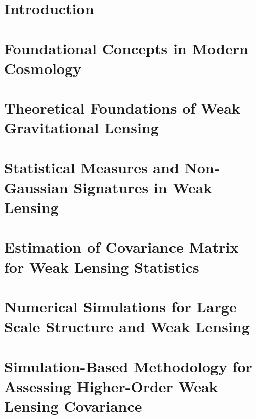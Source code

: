 \documentclass[11pt,a4paper]{ipmu}
\begin{document}
\makethesistitle
\frontmatter
%     


\tableofcontents  %
\listoffigures    %
\listoftables     %


\chapter{Introduction}
\label{chap:introduction}
\mainmatter
\minitoc 


\chapter{Foundational Concepts in Modern Cosmology}
\label{chap:cosmology}
\minitoc 


\chapter{Theoretical Foundations of Weak Gravitational Lensing}
\label{chap:weak_lensing}
\minitoc 


\chapter{Statistical Measures and Non-Gaussian Signatures in Weak Lensing}
\label{chap:statistics}
\minitoc 


\chapter{Estimation of Covariance Matrix for Weak Lensing Statistics}
\label{chap:covariance}
\minitoc 


\chapter{Numerical Simulations for Large Scale Structure and Weak Lensing}
\label{chap:simulation}
\minitoc 


\chapter{Simulation-Based Methodology for Assessing Higher-Order Weak Lensing Covariance}
\label{chap:methods}
\minitoc 

\end{document}
